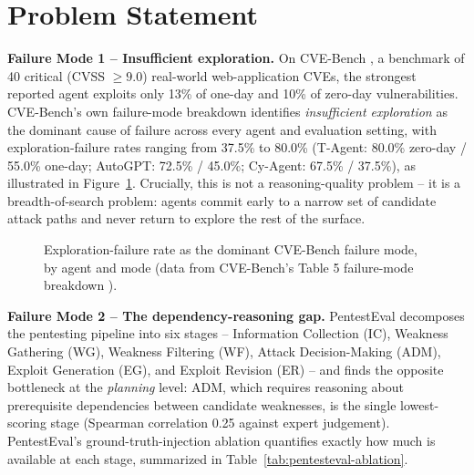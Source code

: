 \section{Problem Statement}
\label{sec:intro_problem}

\textbf{Failure Mode 1 -- Insufficient exploration.} On CVE-Bench \citep{zhu2025cvebench}, a benchmark of 40 critical (CVSS $\geq 9.0$) real-world web-application CVEs, the strongest reported agent exploits only 13\% of one-day and 10\% of zero-day vulnerabilities. CVE-Bench's own failure-mode breakdown identifies \emph{insufficient exploration} as the dominant cause of failure across every agent and evaluation setting, with exploration-failure rates ranging from 37.5\% to 80.0\% (T-Agent: 80.0\% zero-day / 55.0\% one-day; AutoGPT: 72.5\% / 45.0\%; Cy-Agent: 67.5\% / 37.5\%), as illustrated in Figure~\ref{fig:exploration-failure}. Crucially, this is not a reasoning-quality problem -- it is a breadth-of-search problem: agents commit early to a narrow set of candidate attack paths and never return to explore the rest of the surface.

\begin{figure}[htbp]
\centering
{}
\caption{Exploration-failure rate as the dominant CVE-Bench failure mode, by agent and mode (data from CVE-Bench's Table 5 failure-mode breakdown \citep{zhu2025cvebench}).}
\label{fig:exploration-failure}
\end{figure}

\textbf{Failure Mode 2 -- The dependency-reasoning gap.} PentestEval \citep{yang2025pentesteval} decomposes the pentesting pipeline into six stages -- Information Collection (IC), Weakness Gathering (WG), Weakness Filtering (WF), Attack Decision-Making (ADM), Exploit Generation (EG), and Exploit Revision (ER) -- and finds the opposite bottleneck at the \emph{planning} level: ADM, which requires reasoning about prerequisite dependencies between candidate weaknesses, is the single lowest-scoring stage (Spearman correlation 0.25 against expert judgement). PentestEval's ground-truth-injection ablation quantifies exactly how much is available at each stage, summarized in Table~\ref{tab:pentesteval-ablation}.

